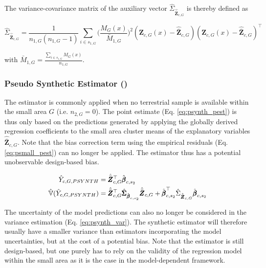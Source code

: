 The variance-covariance matrix of the auxiliary vector $\hat{\Sigma}_{\hat{\bar{\pmb{Z}}}_{c,G}}$ is thereby defined as
	
\begin{equation}\label{estvarcovaux_G}
\hat{\Sigma}_{\hat{\bar{\pmb{Z}}}_{c,G}} = \frac{1}{n_{1,G}(n_{1,G}-1)} \sum_{i \in s_{1,G}} \big(\frac{M_{G}(x)}{\bar{M}_{1,G}}\big)^2 (\pmb{Z}_{c,G}(x)-\hat{\bar{\pmb{Z}}}_{c,G})(\pmb{Z}_{c,G}(x)-\hat{\bar{\pmb{Z}}}_{c,G})^{\top}
\end{equation}

with $\bar{M}_{1,G}=\frac{\sum_{i \in s_{1,G}}M_{G}(x)}{n_{1,G}}$.\\



\subsubsection{Pseudo Synthetic Estimator (\psynth{})}
\label{sec:psynth}

The \psynth{} estimator is commonly applied when no terrestrial sample is available within the small area $G$ (i.e. $n_{2,G}=0$). The point estimate (Eq. \ref{eq:psynth_pest}) is thus only based on the predictions generated by applying the globally derived regression coefficients to the small area cluster means of the explanatory variables $\hat{\bar{\pmb{Z}}}_{c,G}$. Note that the bias correction term using the empirical residuals (Eq. \ref{eq:psmall_pest}) can no longer be applied. The \psynth{} estimator thus has a potential unobservable design-based bias.

\begin{subequations}\label{eq:psynth}
	\begin{align}
	\hat{Y}_{c,G,PSYNTH} & =\hat{\bar{\pmb{Z}}}_{c,G}^{\top}\hat{\pmb{\beta}}_{c,s_2} \label{eq:psynth_pest} \\
	\hat{\mathbb{V}}(\hat{Y}_{c,G,PSYNTH})& =
	\hat{\bar{\pmb{Z}}}_{c,G}^{\top}\hat{\pmb{\Sigma}}_{\hat{\pmb{\beta}}_{c,s_2}}
	\hat{\bar{\pmb{Z}}}_{c,G}
	+ \hat{\pmb{\beta}}^{\top}_{c,s_2}\hat{\Sigma}_{\hat{\bar{\pmb{Z}}}_{c,G}}\hat{\pmb{\beta}}_{c,s_2} \label{eq:psynth_var}
	\end{align}
\end{subequations}

The uncertainty of the model predictions can also no longer be considered in the variance estimation (Eq. \ref{eq:psynth_var}). The synthetic estimator will therefore usually have a smaller variance than estimators incorporating the model uncertainties, but at the cost of a potential bias. Note that the \psynth{} estimator is still design-based, but one purely has to rely on the validity of the regression model within the small area as it is the case in the model-dependent framework.\\

